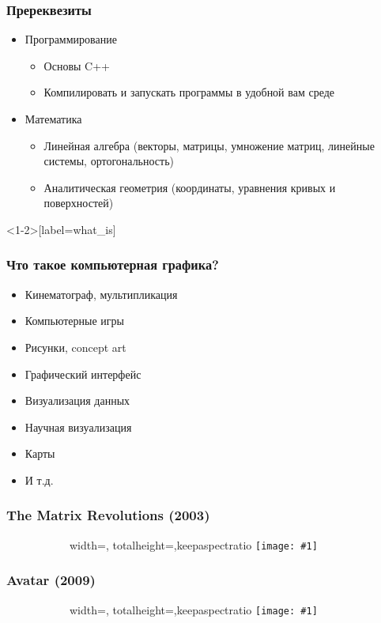 \documentclass{beamer}
\newcommand{\slideimage}[1]{
  \begin{figure}
    \begin{adjustbox}{width=\textwidth, totalheight=\textheight-2\baselineskip-2\baselineskip,keepaspectratio}
      \texttt{[image: \#1]}
    \end{adjustbox}
  \end{figure}
}
\begin{document}
\begin{frame}
\frametitle{Пререквезиты}
\pause
\begin{itemize}
\item Программирование
\pause
\begin{itemize}
\item Основы C++
\pause
\item Компилировать и запускать программы в удобной вам среде
\end{itemize}
\pause
\item Математика
\pause
\begin{itemize}
\item Линейная алгебра (векторы, матрицы, умножение матриц, линейные системы, ортогональность)
\pause
\item Аналитическая геометрия (координаты, уравнения кривых и поверхностей)
\end{itemize}
\end{itemize}
\end{frame}

\begin{frame}<1-2>[label=what_is]
\frametitle{Что такое компьютерная графика?}
\begin{itemize}
\pause %
\item Кинематограф, мультипликация
\pause %
\item Компьютерные игры
\pause %
\item Рисунки, concept art
\pause %
\item Графический интерфейс
\pause %
\item Визуализация данных
\pause %
\item Научная визуализация
\pause %
\item Карты
\pause %
\item И т.д.
\end{itemize}
\end{frame}

\begin{frame}
\frametitle{The Matrix Revolutions (2003)}
\begin{figure}
\slideimage{matrix.jpg}
\end{figure}
\end{frame}

\begin{frame}
\frametitle{Avatar (2009)}
\begin{figure}
\slideimage{avatar.jpg}
\end{figure}
\end{frame}
\end{document}
